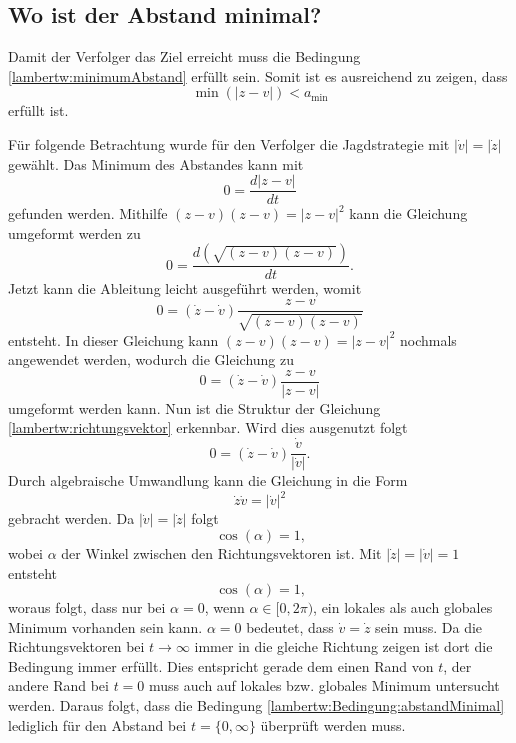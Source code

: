 \subsection{Wo ist der Abstand minimal?}
Damit der Verfolger das Ziel erreicht muss die Bedingung \eqref{lambertw:minimumAbstand} erfüllt sein.
Somit ist es ausreichend zu zeigen, dass
\begin{equation}
    \operatorname{min}(|z-v|)<a_\text{min}
    \label{lambertw:Bedingung:abstandMinimal}
\end{equation}
erfüllt ist.

Für folgende Betrachtung wurde für den Verfolger die Jagdstrategie mit $|\dot{v}|=|\dot{z}|$ gewählt.
Das Minimum des Abstandes kann mit
\begin{equation}
    0=\frac{d|z-v|}{dt}
\end{equation}
gefunden werden.
Mithilfe $(z-v)(z-v)=|z-v|^2$ kann die Gleichung umgeformt werden zu
\begin{equation}
    0=\frac{d(\sqrt{(z-v)(z-v)})}{dt}
    \text{.}
\end{equation}
Jetzt kann die Ableitung leicht ausgeführt werden, womit
\begin{equation}
    0=(\dot{z}-\dot{v})\frac{z-v}{\sqrt{(z-v)(z-v)}}
\end{equation}
entsteht.
In dieser Gleichung kann $(z-v)(z-v)=|z-v|^2$ nochmals angewendet werden, wodurch die Gleichung zu
\begin{equation}
    0=(\dot{z}-\dot{v})\frac{z-v}{|z-v|}
\end{equation}
umgeformt werden kann.
Nun ist die Struktur der Gleichung \eqref{lambertw:richtungsvektor} erkennbar.
Wird dies ausgenutzt folgt
\begin{equation}
    0=(\dot{z}-\dot{v})\frac{\dot{v}}{|\dot{v}|}
    \text{.}
\end{equation}
Durch algebraische Umwandlung kann die Gleichung in die Form
\begin{equation}
    \dot{z}\dot{v}=|\dot{v}|^2
\end{equation}
gebracht werden.
Da $|\dot{v}|=|\dot{z}|$ folgt
\begin{equation}
    \cos(\alpha)=1
    \text{,}
\end{equation}
wobei $\alpha$ der Winkel zwischen den Richtungsvektoren ist.
Mit $|\dot{z}|=|\dot{v}|=1$ entsteht
\begin{equation}
    \cos(\alpha)=1
    \text{,}
\end{equation}
woraus folgt, dass nur bei $\alpha=0$, wenn $\alpha \in [0,2\pi)$, ein lokales als auch globales Minimum vorhanden sein kann.
$\alpha=0$ bedeutet, dass $\dot{v}=\dot{z}$ sein muss.
Da die Richtungsvektoren bei $t\rightarrow\infty$ immer in die gleiche Richtung zeigen ist dort die Bedingung immer erfüllt.
Dies entspricht gerade dem einen Rand von $t$, der andere Rand bei $t=0$ muss auch auf lokales bzw. globales Minimum untersucht werden.
Daraus folgt, dass die Bedingung \eqref{lambertw:Bedingung:abstandMinimal} lediglich für den Abstand bei $t=\{0, \infty\}$ überprüft werden muss.